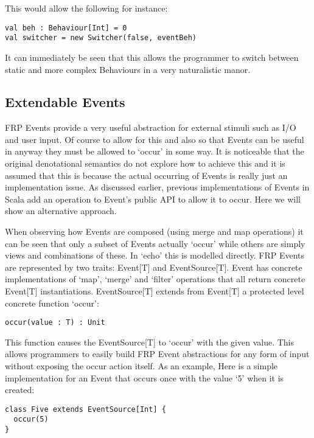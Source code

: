       This would allow the following for instance:

\begin{verbatim}
val beh : Behaviour[Int] = 0
val switcher = new Switcher(false, eventBeh)
\end{verbatim}       

      It can immediately be seen that this allows the programmer to switch between static and more complex
      Behaviours in a very naturalistic manor.
      
    \subsection{Extendable Events}
      FRP Events provide a very useful abstraction for external stimuli such as I/O and user input. Of course
      to allow for this and also so that Events can be useful in anyway they must be allowed to `occur' in some way.
      It is noticeable that the original denotational semantics \cite{Elliott1997} do not explore how to achieve
      this and it is assumed that this is because the actual occurring of Events is really just an implementation
      issue. As discussed earlier, previous implementations of Events in Scala add an operation to Event's
      public API to allow it to occur. Here we will show an alternative approach.
      
      When observing how Events are composed (using merge and map operations) it can be seen that
      only a subset of Events actually `occur' while others are simply views and combinations of these.
      In `echo' this is modelled directly. FRP Events are represented by two traits: Event[T] and EventSource[T].
      Event has concrete implementations of `map', `merge' and `filter' operations that
      all return concrete Event[T] instantiations. EventSource[T] extends
      from Event[T] a protected level concrete function `occur':
      
\begin{verbatim}
occur(value : T) : Unit
\end{verbatim}  

      This function causes the EventSource[T] to `occur' with the given value. This allows programmers
      to easily build FRP Event abstractions for any form of input without exposing the occur action itself.
      As an example, Here is a simple implementation for an Event that occurs once with the value `5' when it 
      is created:
      
\begin{verbatim}
class Five extends EventSource[Int] {
  occur(5)
}
\end{verbatim}

